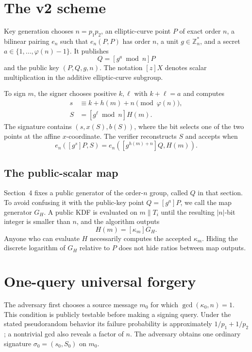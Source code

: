 \documentclass[10pt,a4paper]{article}
\newcommand{\Z}{\mathbb{Z}}
\newcommand{\GH}{G_H}
\begin{document}
\section{The v2 scheme}
\label{sec:scheme}

Key generation chooses $n=p_1p_2$, an elliptic-curve point $P$ of exact order
$n$, a bilinear pairing $e_n$ such that $e_n(P,P)$ has order $n$, a unit
$g\in\Z_n^*$, and a secret $a\in\{1,\ldots,\varphi(n)-1\}$.  It publishes
\[
  Q=[g^a\bmod n]P
\]
and the public key $(P,Q,g,n)$.  The notation $[z]X$ denotes scalar
multiplication in the additive elliptic-curve subgroup.

To sign $m$, the signer chooses positive $k,\ell$ with $k+\ell=a$ and computes
\begin{align}
  s &\equiv k+h(m)+n \pmod{\varphi(n)}, \\
  S &= [g^\ell\bmod n]H(m).
\end{align}
The signature contains $(s,x(S),b(S))$, where the bit selects one of the two
points at the affine $x$-coordinate.  The verifier reconstructs $S$ and accepts
when
\begin{equation}
  e_n([g^s]P,S)
  =e_n([g^{h(m)+n}]Q,H(m)).
  \label{eq:verify}
\end{equation}

\subsection{The public-scalar map}

Section~4 fixes a public generator of the order-$n$ group, called $Q$ in that
section.  To avoid confusing it with the public-key point $Q=[g^a]P$, we call
the map generator $\GH$.  A public KDF is evaluated on $m\mathbin\|T_i$ until
the resulting $|n|$-bit integer is smaller than $n$, and the algorithm outputs
\begin{equation}
  H(m)=[\kappa_m]\GH.
  \label{eq:map}
\end{equation}
Anyone who can evaluate $H$ necessarily computes the accepted
$\kappa_m$.  Hiding the discrete logarithm of $\GH$ relative to $P$ does not
hide ratios between map outputs.

\section{One-query universal forgery}

The adversary first chooses a source message $m_0$ for which
$\gcd(\kappa_0,n)=1$.  This condition is publicly testable before making a
signing query.  Under the stated pseudorandom behavior its failure probability
is approximately $1/p_1+1/p_2$; a nontrivial gcd also reveals a factor of $n$.
The adversary obtains one ordinary signature $\sigma_0=(s_0,S_0)$ on $m_0$.
\end{document}
